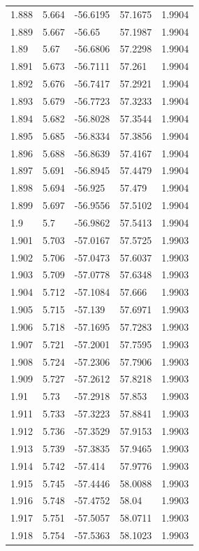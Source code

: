 \begin{tabular}{lllll}
1.888 & 5.664 & -56.6195 & 57.1675 & 1.9904 \\
1.889 & 5.667 & -56.65 & 57.1987 & 1.9904 \\
1.89 & 5.67 & -56.6806 & 57.2298 & 1.9904 \\
1.891 & 5.673 & -56.7111 & 57.261 & 1.9904 \\
1.892 & 5.676 & -56.7417 & 57.2921 & 1.9904 \\
1.893 & 5.679 & -56.7723 & 57.3233 & 1.9904 \\
1.894 & 5.682 & -56.8028 & 57.3544 & 1.9904 \\
1.895 & 5.685 & -56.8334 & 57.3856 & 1.9904 \\
1.896 & 5.688 & -56.8639 & 57.4167 & 1.9904 \\
1.897 & 5.691 & -56.8945 & 57.4479 & 1.9904 \\
1.898 & 5.694 & -56.925 & 57.479 & 1.9904 \\
1.899 & 5.697 & -56.9556 & 57.5102 & 1.9904 \\
1.9 & 5.7 & -56.9862 & 57.5413 & 1.9904 \\
1.901 & 5.703 & -57.0167 & 57.5725 & 1.9903 \\
1.902 & 5.706 & -57.0473 & 57.6037 & 1.9903 \\
1.903 & 5.709 & -57.0778 & 57.6348 & 1.9903 \\
1.904 & 5.712 & -57.1084 & 57.666 & 1.9903 \\
1.905 & 5.715 & -57.139 & 57.6971 & 1.9903 \\
1.906 & 5.718 & -57.1695 & 57.7283 & 1.9903 \\
1.907 & 5.721 & -57.2001 & 57.7595 & 1.9903 \\
1.908 & 5.724 & -57.2306 & 57.7906 & 1.9903 \\
1.909 & 5.727 & -57.2612 & 57.8218 & 1.9903 \\
1.91 & 5.73 & -57.2918 & 57.853 & 1.9903 \\
1.911 & 5.733 & -57.3223 & 57.8841 & 1.9903 \\
1.912 & 5.736 & -57.3529 & 57.9153 & 1.9903 \\
1.913 & 5.739 & -57.3835 & 57.9465 & 1.9903 \\
1.914 & 5.742 & -57.414 & 57.9776 & 1.9903 \\
1.915 & 5.745 & -57.4446 & 58.0088 & 1.9903 \\
1.916 & 5.748 & -57.4752 & 58.04 & 1.9903 \\
1.917 & 5.751 & -57.5057 & 58.0711 & 1.9903 \\
1.918 & 5.754 & -57.5363 & 58.1023 & 1.9903 \\

\end{tabular}
